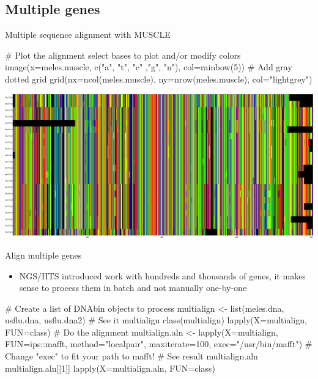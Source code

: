 \documentclass[compress, ucs, xelatex, 11pt, xcolor=svgnames, aspectratio=169,
	hyperref={
		bookmarks=true,
		unicode=true,
		colorlinks=true,
		pdftitle={Molecular data in R},
		plainpages=false,
		pdfauthor={Vojtech Zeisek},
		pdfsubject={Course about phylogeny and evolution in R},
		pdfcreator={XeLaTeX},
		pdfkeywords={R, evolution, phylogeny, molecular data},
		linkcolor=Crimson, %
		anchorcolor=Magenta, %
		citecolor=Magenta, %
		filecolor=Magenta, %
		menucolor=Magenta, %
		urlcolor=DodgerBlue, %
		pdftex},
	url={hyphens, lowtilde} %
	]{beamer}
\begin{document}
\subsection{Multiple genes}

\begin{frame}[fragile]{Multiple sequence alignment with MUSCLE}
	\begin{spluscode}
    # Plot the alignment select bases to plot and/or modify colors
    image(x=meles.muscle, c("a", "t", "c" ,"g", "n"), col=rainbow(5))
    # Add gray dotted grid
    grid(nx=ncol(meles.muscle), ny=nrow(meles.muscle), col="lightgrey")
	\end{spluscode}
	\vfill
	\begin{center}
		\includegraphics[width=\textwidth-6cm]{muscle.png}
	\end{center}
\end{frame}

\begin{frame}[fragile]{Align multiple genes}
	\begin{itemize}
		\item NGS/HTS introduced work with hundreds and thousands of genes, it makes sense to process them in batch and not manually one-by-one
	\end{itemize}
	\begin{spluscode}
    # Create a list of DNAbin objects to process
    multialign <- list(meles.dna, usflu.dna, usflu.dna2)
    # See it
    multialign
    class(multialign)
    lapply(X=multialign, FUN=class)
    # Do the alignment
    multialign.aln <- lapply(X=multialign, FUN=ips::mafft, method="localpair",
    maxiterate=100, exec="/usr/bin/mafft")
      # Change "exec" to fit your path to mafft!
    # See result
    multialign.aln
    multialign.aln[[1]]
    lapply(X=multialign.aln, FUN=class)
	\end{spluscode}
\end{frame}
\end{document}
